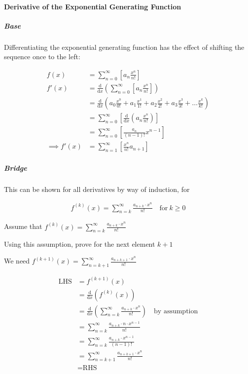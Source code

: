 \documentclass[11pt]{article}
\begin{document}
\paragraph{Derivative of the Exponential Generating Function}
\label{Derivative-exp-gen-function}
\subparagraph{Base}
\label{sec:orgb7d7577}
Differentiating the exponential generating function has the effect of shifting the sequence once to the left: \cite{lehmanReadingsMathematicsComputer2010}

\begin{align}
    f\left( x \right) &= \sum^{\infty}_{n= 0}   \left[ a_n \frac{x^n}{n!} \right] \label{eq:exp-pow-series} \\
f'\left( x \right) &= \frac{\mathrm{d} }{\mathrm{d} x}\left( \sum^{\infty}_{n= 0}   \left[ a_n \frac{x^n}{n!} \right]  \right) \nonumber \\
&= \frac{\mathrm{d}}{\mathrm{d} x} \left( a_0 \frac{x^0}{0!} +  a_1 \frac{x^1}{1!} +  a_2 \frac{x^2}{2!}+  a_3 \frac{x^3}{3! } +  \ldots \frac{x^k}{k!} \right) \nonumber \\
&= \sum^{\infty}_{n= 0}   \left[ \frac{\mathrm{d} }{\mathrm{d} x}\left( a_n \frac{x^n}{n!} \right) \right] \nonumber \\
&= \sum^{\infty}_{n= 0}   {\left[{ \frac{a_n}{{\left({ n- 1 }\right)!}} } x^{n- 1}  \right]} \nonumber \\
\implies f'(x) &= \sum^{\infty}_{n= 1}   {\left[{ \frac{x^n}{n!}a_{n+  1} }\right]} \label{eq:exp-pow-series-sol}
\end{align}

\subparagraph{Bridge}
\label{sec:orga903342}
This can be shown for all derivatives by way of induction, for

\begin{align}
f^{(k)}\left(x\right) = \sum_{n=k}^\infty\frac{a_{n+k}\cdot x^n}{n!} \quad \text{for}~k \ge 0
\end{align}

Assume that \(f^{(k)}\left(x\right) = \sum_{n=k}^\infty\frac{a_{n+k}\cdot x^n}{n!}\)

Using this assumption, prove for the next element \(k+1\)

We need \(f^{(k+1)}(x) = \sum_{n=k+1}^\infty\frac{a_{n+k+1}\cdot x^n}{n!}\)

\begin{align*}
    \text{LHS} &= f^{(k+1)}(x)\\
    &= \frac{\mathrm{d}}{\mathrm{d}x}\left(f^{(k)}(x)\right)\\
    &= \frac{\mathrm{d}}{\mathrm{d}x}\left(\sum_{n=k}^\infty\frac{a_{n+k}\cdot x^n}{n!}\right)\quad \text{by assumption}\\
    &= \sum_{n=k}^\infty\frac{a_{n+k}\cdot n\cdot x^{n-1}}{n!}\\
    &= \sum_{n=k}^\infty\frac{a_{n+k}\cdot x^{n-1}}{(n-1)!}\\
    &= \sum_{n=k+1}^\infty\frac{a_{n+k+1}\cdot x^{n}}{n!}\\
    &= \text{RHS}
\end{align*}
\end{document}
